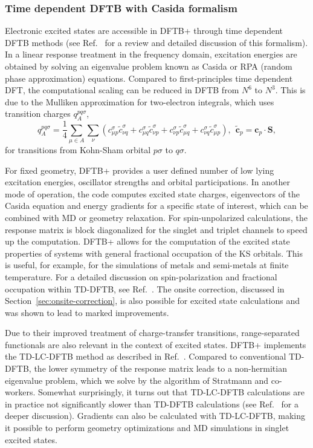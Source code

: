 \documentclass[reprint,onecolumn,superscriptaddress]{revtex4-1}
\newcommand{\dftbp}{DFTB+}
\begin{document}
\subsubsection{Time dependent DFTB with Casida formalism}
\label{sec:TD-DFTB}

Electronic excited states are accessible in \dftbp{} through time dependent DFTB
methods (see Ref.~\cite{Niehaus2009} for a review and detailed
discussion of this formalism). In a linear response treatment in the
frequency domain, excitation energies are obtained by solving an eigenvalue
problem known as Casida or RPA (random phase approximation)
equations. Compared to first-principles time dependent DFT, the computational
scaling can be reduced in DFTB from $N^6$ to $N^3$. This is due to the Mulliken
approximation for two-electron integrals,\cite{Niehaus2001a} which uses
transition charges $q^{pq\sigma}_A$,
\begin{equation}
  \label{qia}
  q_{A}^{pq\sigma} = \frac{1}{4} \sum_{\mu \in A}\sum_\nu  \left( c_{\mu
      p}^{\sigma} \tilde{c}_{\nu q}^{\sigma} +  c_{\mu q}^{\sigma}
    \tilde{c}_{\nu p}^{\sigma} + c_{\nu p}^{\sigma} \tilde{c}_{\mu
      q}^{\sigma} + c_{\nu q}^{\sigma} \tilde{c}_{\mu p}^{\sigma}
  \right), ~~ \tilde{\mathbf{c}}_p =  \mathbf{c}_p\cdot\mathbf{S},
\end{equation}
for transitions from Kohn-Sham orbital $p\sigma$ to $q\sigma$.

For fixed geometry, \dftbp{} provides a user defined number of low lying
excitation energies, oscillator strengths and orbital participations.  In
another mode of operation, the code computes excited state charges, eigenvectors
of the Casida equation and energy gradients for a specific state of interest,
which can be combined with MD or geometry relaxation. For spin-unpolarized
calculations, the response matrix is block diagonalized for the singlet and
triplet channels to speed up the computation.  \dftbp{} allows for the
computation of the excited state properties of systems with general fractional
occupation of the KS orbitals. This is useful, for example, for the simulations
of metals and semi-metals at finite temperature. For a detailed discussion on
spin-polarization and fractional occupation within TD-DFTB, see
Ref.~\cite{Dominguez2013}. The onsite correction, discussed in
Section~\ref{sec:onsite-correction}, is also possible for excited state
calculations and was shown to lead to marked improvements.\cite{Dominguez2013}

Due to their improved treatment of charge-transfer transitions, range-separated
functionals are also relevant in the context of excited states. \dftbp{} implements
the TD-LC-DFTB method as described in Ref.~\cite{Kranz2017}. Compared to
conventional TD-DFTB, the lower symmetry of the response matrix leads to a
non-hermitian eigenvalue problem, which we solve by the algorithm
of Stratmann and co-workers.\cite{Stratmann1998} Somewhat
surprisingly, it turns out that TD-LC-DFTB calculations are in practice not
significantly slower than TD-DFTB calculations (see Ref.~\cite{Kranz2017}
for a deeper discussion). Gradients can also be calculated with TD-LC-DFTB,
making it possible to perform geometry optimizations and MD simulations in
singlet excited states.
\end{document}
